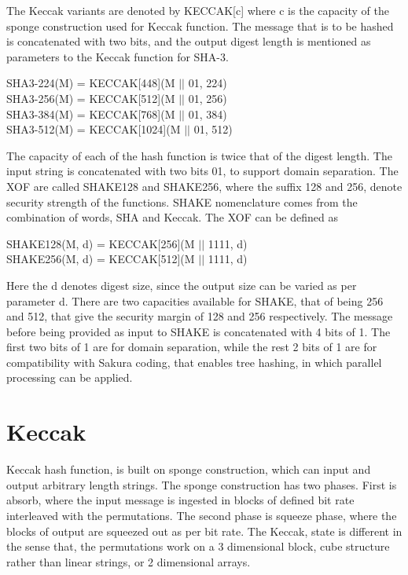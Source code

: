 The Keccak variants are denoted by KECCAK[c] where c is the capacity of the sponge construction used for Keccak
function. The message that is to be hashed is concatenated with two bits, and the output digest length is mentioned
as parameters to the Keccak function for SHA-3.
\begin{center}
SHA3-224(M) = KECCAK[448](M $\vert \vert$ 01, 224) \\
SHA3-256(M) = KECCAK[512](M $\vert \vert$ 01, 256) \\
SHA3-384(M) = KECCAK[768](M $\vert \vert$ 01, 384) \\
SHA3-512(M) = KECCAK[1024](M $\vert \vert$ 01, 512)
\end{center}
The capacity of each of the hash function is twice that of the digest length. The input string is concatenated with two
bits 01, to support domain separation. The XOF are called SHAKE128 and SHAKE256, where the suffix 128 and 256, denote
security strength of the functions. SHAKE nomenclature comes from the combination of words, SHA and Keccak. The XOF
can be defined as 
\begin{center}
SHAKE128(M, d) = KECCAK[256](M $\vert \vert$ 1111, d) \\
SHAKE256(M, d) = KECCAK[512](M $\vert \vert$ 1111, d)
\end{center}
Here the d denotes digest size, since the output size can be varied as per parameter d. There are two capacities available
for SHAKE, that of being 256 and 512, that give the security margin of 128 and 256 respectively. The message before
being provided as input to SHAKE is concatenated  with 4 bits of 1. The first two bits of 1 are for domain separation,
while the rest 2 bits of 1 are for compatibility with Sakura coding, that enables tree hashing, in which parallel
processing can be applied.

\section{Keccak}
Keccak hash function, is built on sponge construction, which can input and output arbitrary length strings. The sponge
construction has two phases. First is absorb, where the input message is ingested in blocks of defined bit rate interleaved
with the permutations. The second phase is squeeze phase, where the blocks of output are squeezed out as per bit rate. 
The Keccak, state is different in the sense that, the permutations work on a 3 dimensional block, cube
structure rather than linear strings, or 2 dimensional arrays.

